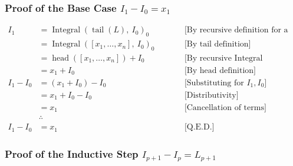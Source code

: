 \subsubsection*{Proof of the Base Case $I_1 - I_0 = x_1$}

\begin{equation*}
\begin{aligned}
I_1 &= \operatorname{Integral}(\operatorname{tail}(L),\ I_0)_0
  & \qquad &\text{[By recursive definition for a non-first element]} \\
    &= \operatorname{Integral}([x_1, \dots, x_n],\ I_0)_0
  & \qquad &\text{[By tail definition]} \\
    &= \operatorname{head}([x_1, \dots, x_n]) + I_0
  & \qquad &\text{[By recursive Integral definition for the first element]} \\
    &= x_1 + I_0
  & \qquad &\text{[By head definition]} \\
I_1 - I_0 &= (x_1 + I_0) - I_0
  & \qquad &\text{[Substituting for } I_1, I_0] \\
    &= x_1 + I_0 - I_0
  & \qquad &\text{[Distributivity]} \\
    &= x_1
  & \qquad &\text{[Cancellation of terms]} \\
    & \therefore \\
I_1 - I_0 &= x_1
  & \qquad &\text{[Q.E.D.]}
\end{aligned}
\end{equation*}

\subsubsection*{Proof of the Inductive Step $I_{p+1} - I_p = L_{p+1}$}

